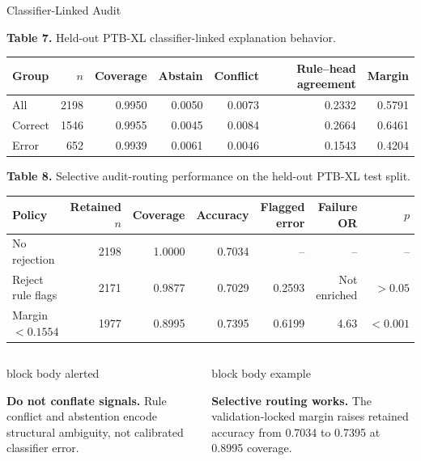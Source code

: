 \documentclass[aspectratio=169,xcolor=dvipsnames]{beamer}
\begin{document}
\begin{frame}{Classifier-Linked Audit}
\scriptsize
{\scriptsize\textbf{Table 7.} Held-out PTB-XL classifier-linked explanation behavior.\par}
\vspace{0.08em}
\begin{tabularx}{\linewidth}{lrrrrrr}
\toprule
\textbf{Group} & \textbf{$n$} & \textbf{Coverage} & \textbf{Abstain} &
\textbf{Conflict} & \textbf{Rule--head agreement} & \textbf{Margin}\\
\midrule
All & 2198 & 0.9950 & 0.0050 & 0.0073 & 0.2332 & 0.5791\\
Correct & 1546 & 0.9955 & 0.0045 & 0.0084 & 0.2664 & 0.6461\\
Error & 652 & 0.9939 & 0.0061 & 0.0046 & 0.1543 & 0.4204\\
\bottomrule
\end{tabularx}
\vspace{0.28em}
{\scriptsize\textbf{Table 8.} Selective audit-routing performance on the
held-out PTB-XL test split.\par}
\vspace{0.08em}
\begin{tabularx}{\linewidth}{Yrrrrrr}
\toprule
\textbf{Policy} & \textbf{Retained $n$} & \textbf{Coverage} &
\textbf{Accuracy} & \textbf{Flagged error} & \textbf{Failure OR} & \textbf{$p$}\\
\midrule
No rejection & 2198 & 1.0000 & 0.7034 & -- & -- & --\\
Reject rule flags & 2171 & 0.9877 & 0.7029 & 0.2593 & Not enriched & $>0.05$\\
Margin $<0.1554$ & 1977 & 0.8995 & 0.7395 & 0.6199 & 4.63 & $<0.001$\\
\bottomrule
\end{tabularx}
\vspace{0.26em}
\begin{columns}[T,onlytextwidth]
  \begin{beamercolorbox}[wd=\linewidth,sep=0.45em]{block body alerted}
  {\scriptsize\textbf{Do not conflate signals.} Rule conflict and abstention
  encode structural ambiguity, not calibrated classifier error.\par}
  \end{beamercolorbox}
  \begin{beamercolorbox}[wd=\linewidth,sep=0.45em]{block body example}
  {\scriptsize\textbf{Selective routing works.} The validation-locked margin
  raises retained accuracy from 0.7034 to 0.7395 at 0.8995 coverage.\par}
  \end{beamercolorbox}
\end{columns}
\end{frame}
\end{document}
